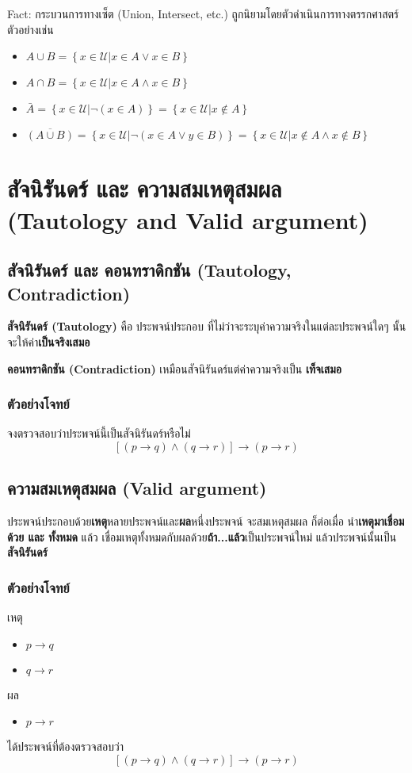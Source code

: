 \documentclass[12pt,a4paper]{article}
\begin{document}
\rule{0pt}{4ex}
Fact: กระบวนการทางเซ็ต (Union, Intersect, etc.) ถูกนิยามโดยตัวดำเนินการทางตรรกศาสตร์
ตัวอย่างเช่น
\begin{itemize}
    \item $A \cup B = \left\{x \in \mathcal{U} \lvert x \in A \lor x\in B \right\}$
    \item $A \cap B = \left\{x \in \mathcal{U} \lvert x \in A \land x\in B \right\}$
    \item $\bar{A} = \left\{x \in \mathcal{U} \lvert \neg( x \in A) \right\} = \left\{x \in \mathcal{U}| x \not\in A\right\}$
    \item $\overline{(A \cup B)} = \left\{ x \in \mathcal{U} \lvert \neg(x\in A \lor y\in B) \right\} = \left\{ x \in \mathcal{U} \lvert x\not\in A \land x\not\in B \right\}$
\end{itemize}
\hrulefill
\newpage

\section*{สัจนิรันดร์ และ ความสมเหตุสมผล (Tautology and Valid argument)}
\subsection*{สัจนิรันดร์ และ คอนทราดิกชัน (Tautology, Contradiction)}
\quad \textbf{สัจนิรันดร์ (Tautology)} คือ ประพจน์ประกอบ ที่ไม่ว่าจะระบุค่าความจริงในแต่ละประพจน์ใดๆ นั้นจะให้ค่า\textbf{เป็นจริงเสมอ}\par
\textbf{คอนทราดิกชัน (Contradiction)} เหมือนสัจนิรันดร์แต่ค่าความจริงเป็น \textbf{เท็จเสมอ}
\subsubsection*{ตัวอย่างโจทย์}
จงตรวจสอบว่าประพจน์นี้เป็นสัจนิรันดร์หรือไม่
$$
    \left[ (p \rightarrow q) \land (q \rightarrow r) \right] \rightarrow (p \rightarrow r)
$$
\rule{0pt}{35ex}
\subsection*{ความสมเหตุสมผล (Valid argument)}
\quad ประพจน์ประกอบด้วย\textbf{เหตุ}หลายประพจน์และ\textbf{ผล}หนึ่งประพจน์ จะสมเหตุสมผล ก็ต่อเมื่อ นำ\textbf{เหตุมาเชื่อมด้วย และ ทั้งหมด} แล้ว เชื่อมเหตุทั้งหมดกับผลด้วย\textbf{ถ้า...แล้ว}เป็นประพจน์ใหม่ แล้วประพจน์นั้นเป็น \textbf{สัจนิรันดร์}

\subsubsection*{ตัวอย่างโจทย์}
เหตุ
\begin{itemize}
    \item $p \rightarrow q$
    \item $q \rightarrow r$
\end{itemize}
ผล
\begin{itemize}
    \item $p \rightarrow r$
\end{itemize}
ได้ประพจน์ที่ต้องตรวจสอบว่า
$$
    \left[ (p \rightarrow q) \land (q \rightarrow r) \right] \rightarrow (p \rightarrow r)
$$
\hrulefill
\end{document}
